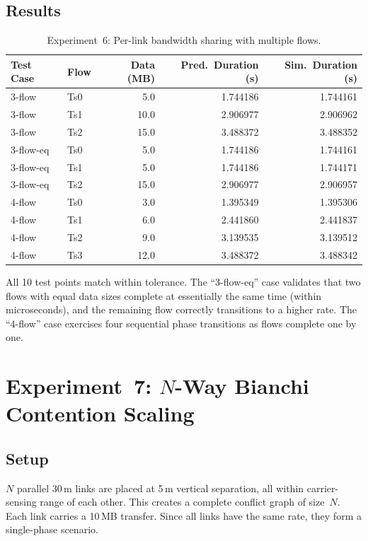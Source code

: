 \documentclass[11pt,a4paper]{article}
\begin{document}
\subsection{Results}

\begin{table}[h]
\centering
\caption{Experiment~6: Per-link bandwidth sharing with multiple flows.}
\label{tab:exp6}
\begin{tabular}{llrrr}
\toprule
Test Case & Flow & Data (MB) & Pred.\ Duration (s) & Sim.\ Duration (s) \\
\midrule
3-flow & Ts0 &  5.0 & 1.744186 & 1.744161 \\
3-flow & Ts1 & 10.0 & 2.906977 & 2.906962 \\
3-flow & Ts2 & 15.0 & 3.488372 & 3.488352 \\
\midrule
3-flow-eq & Ts0 &  5.0 & 1.744186 & 1.744161 \\
3-flow-eq & Ts1 &  5.0 & 1.744186 & 1.744171 \\
3-flow-eq & Ts2 & 15.0 & 2.906977 & 2.906957 \\
\midrule
4-flow & Ts0 &  3.0 & 1.395349 & 1.395306 \\
4-flow & Ts1 &  6.0 & 2.441860 & 2.441837 \\
4-flow & Ts2 &  9.0 & 3.139535 & 3.139512 \\
4-flow & Ts3 & 12.0 & 3.488372 & 3.488342 \\
\bottomrule
\end{tabular}
\end{table}

All 10 test points match within tolerance. The ``3-flow-eq'' case validates that two flows with equal data sizes complete at essentially the same time (within microseconds), and the remaining flow correctly transitions to a higher rate. The ``4-flow'' case exercises four sequential phase transitions as flows complete one by one.

\section{Experiment~7: $N$-Way Bianchi Contention Scaling}
\label{sec:exp7}

\subsection{Setup}
$N$ parallel 30\,m links are placed at 5\,m vertical separation, all within carrier-sensing range of each other. This creates a complete conflict graph of size~$N$. Each link carries a 10\,MB transfer. Since all links have the same rate, they form a single-phase scenario.
\end{document}
